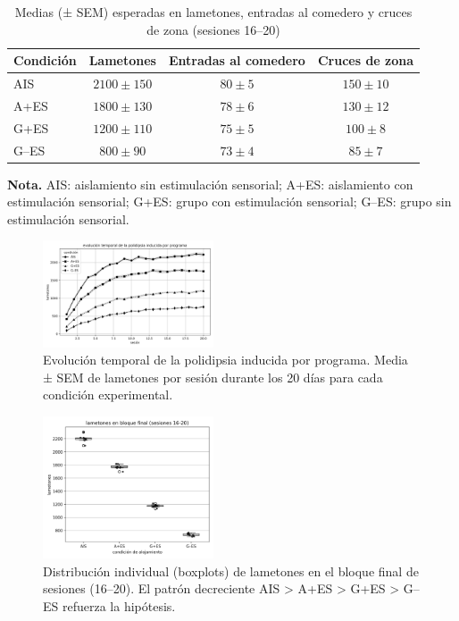 \documentclass[12pt,a4paper]{article}
\begin{document}
\begin{multicols}{2}
\begin{table}[t]
    \centering
    \caption{Medias (± SEM) esperadas en lametones, entradas al comedero y cruces de zona (sesiones 16--20)}
    \label{tab:tabla1}
    \begin{tabular}{lccc}
    \toprule
    \textbf{Condición} & \textbf{Lametones} & \textbf{Entradas al comedero} & \textbf{Cruces de zona} \\
    \midrule
    AIS   & $2100 \pm 150$ & $80 \pm 5$ & $150 \pm 10$ \\
    A+ES  & $1800 \pm 130$ & $78 \pm 6$ & $130 \pm 12$ \\
    G+ES  & $1200 \pm 110$ & $75 \pm 5$ & $100 \pm 8$ \\
    G--ES & $800 \pm 90$   & $73 \pm 4$ & $85 \pm 7$ \\
    \bottomrule
    \end{tabular}
    
    \vspace{1mm}
    \parbox{\textwidth}{\small \textbf{Nota.} AIS: aislamiento sin estimulación sensorial; A+ES: aislamiento con estimulación sensorial; G+ES: grupo con estimulación sensorial; G--ES: grupo sin estimulación sensorial.}
\end{table}


\begin{figure}[H]
\centering
\includegraphics[width=0.45\textwidth]{figura1.png}
\caption{Evolución temporal de la polidipsia inducida por programa. Media ± SEM de lametones por sesión durante los 20 días para cada condición experimental.}
\label{fig:figura1}
\end{figure}

\begin{figure}[H]
\centering
\includegraphics[width=0.45\textwidth]{figura2.png}
\caption{Distribución individual (boxplots) de lametones en el bloque final de sesiones (16–20). El patrón decreciente AIS > A+ES > G+ES > G--ES refuerza la hipótesis.}
\label{fig:figura2}
\end{figure}



\end{multicols}
\end{document}
